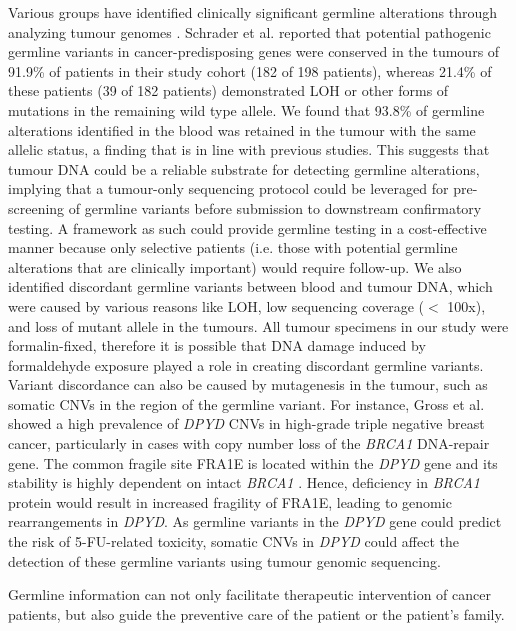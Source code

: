 Various groups have identified clinically significant germline alterations through analyzing tumour genomes \cite{Schrader2015, Meric-Bernstam2016, Jones2015a}. Schrader et al. \cite{Schrader2015} reported that potential pathogenic germline variants in cancer-predisposing genes were conserved in the tumours of 91.9\% of patients in their study cohort (182 of 198 patients), whereas 21.4\% of these patients (39 of 182 patients) demonstrated LOH or other forms of mutations in the remaining wild type allele. We found that 93.8\% of germline alterations identified in the blood was retained in the tumour with the same allelic status, a finding that is in line with previous studies. This suggests that tumour DNA could be a reliable substrate for detecting germline alterations, implying that a tumour-only sequencing protocol could be leveraged for pre-screening of germline variants before submission to downstream confirmatory testing. A framework as such could provide germline testing in a cost-effective manner because only selective patients (i.e. those with potential germline alterations that are clinically important) would require follow-up. We also identified discordant germline variants between blood and tumour DNA, which were caused by various reasons like LOH, low sequencing coverage ($<$ 100x), and loss of mutant allele in the tumours. All tumour specimens in our study were formalin-fixed, therefore it is possible that DNA damage induced by formaldehyde exposure played a role in creating discordant germline variants. Variant discordance can also be caused by mutagenesis in the tumour, such as somatic CNVs in the region of the germline variant. For instance, Gross et al. \cite{Gross2013} showed a high prevalence of \textit{DPYD} CNVs in high-grade triple negative breast cancer, particularly in cases with copy number loss of the \textit{BRCA1} DNA-repair gene. The common fragile site FRA1E is located within the \textit{DPYD} gene and its stability is highly dependent on intact \textit{BRCA1} \cite{Arlt2004}. Hence, deficiency in \textit{BRCA1} protein would result in increased fragility of FRA1E, leading to genomic rearrangements in \textit{DPYD}. As germline variants in the \textit{DPYD} gene could predict the risk of 5-FU-related toxicity, somatic CNVs in \textit{DPYD} could affect the detection of these germline variants using tumour genomic sequencing.

Germline information can not only facilitate therapeutic intervention of cancer patients, but also guide the preventive care of the patient or the patient’s family.

